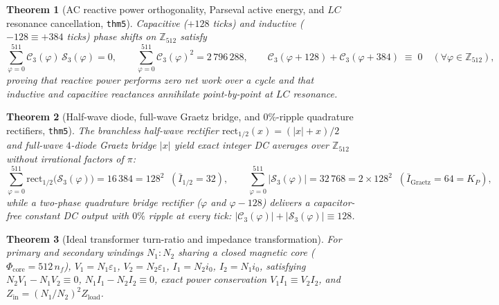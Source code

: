 \documentclass[11pt,a4paper]{article}
\newtheorem{theorem}{Theorem}[section]
\theoremstyle{definition}
\theoremstyle{remark}
\begin{document}
\begin{theorem}[AC reactive power orthogonality, Parseval active energy, and $LC$ resonance cancellation, \texttt{thm5}]
\label{thm:ac-rlc-laws}
Capacitive ($+128$ ticks) and inductive ($-128 \equiv +384$ ticks) phase shifts on $\mathbb{Z}_{512}$ satisfy
\begin{equation}
  \label{eq:ac-rlc-laws}
  \sum_{\varphi=0}^{511} \mathcal{C}_3(\varphi)\,\mathcal{S}_3(\varphi) = 0, \qquad
  \sum_{\varphi=0}^{511} \mathcal{C}_3(\varphi)^2 = 2\,796\,288, \qquad
  \mathcal{C}_3(\varphi + 128) + \mathcal{C}_3(\varphi + 384) \;\equiv\; 0 \quad (\forall\varphi\in\mathbb{Z}_{512}),
\end{equation}
proving that reactive power performs zero net work over a cycle and that inductive and capacitive reactances annihilate point-by-point at $LC$ resonance.
\end{theorem}

\begin{theorem}[Half-wave diode, full-wave Graetz bridge, and $0\%$-ripple quadrature rectifiers, \texttt{thm5}]
\label{thm:rectifiers}
The branchless half-wave rectifier $\mathrm{rect}_{1/2}(x) = (|x|+x)/2$ and full-wave $4$-diode Graetz bridge $|x|$ yield exact integer DC averages over $\mathbb{Z}_{512}$ without irrational factors of $\pi$:
\begin{equation}
  \label{eq:rectifiers}
  \sum_{\varphi=0}^{511}\mathrm{rect}_{1/2}\bigl(\mathcal{S}_3(\varphi)\bigr) = 16\,384 = 128^2 \;\;(\bar{I}_{1/2} = 32), \qquad
  \sum_{\varphi=0}^{511}\bigl|\mathcal{S}_3(\varphi)\bigr| = 32\,768 = 2\times 128^2 \;\;(\bar{I}_{\mathrm{Graetz}} = 64 = K_P),
\end{equation}
while a two-phase quadrature bridge rectifier ($\varphi$ and $\varphi - 128$) delivers a capacitor-free constant DC output with $0\%$ ripple at every tick: $|\mathcal{C}_3(\varphi)| + |\mathcal{S}_3(\varphi)| \equiv 128$.
\end{theorem}

\begin{theorem}[Ideal transformer turn-ratio and impedance transformation]
\label{thm:transformer}
For primary and secondary windings $N_1 : N_2$ sharing a closed magnetic core ($\Phi_{\mathrm{core}} = 512\,n_f$), $V_1 = N_1\varepsilon_1$, $V_2 = N_2\varepsilon_1$, $I_1 = N_2 i_0$, $I_2 = N_1 i_0$, satisfying $N_2 V_1 - N_1 V_2 \equiv 0$, $N_1 I_1 - N_2 I_2 \equiv 0$, exact power conservation $V_1 I_1 \equiv V_2 I_2$, and $Z_{\mathrm{in}} = (N_1/N_2)^2 Z_{\mathrm{load}}$.
\end{theorem}
\end{document}
